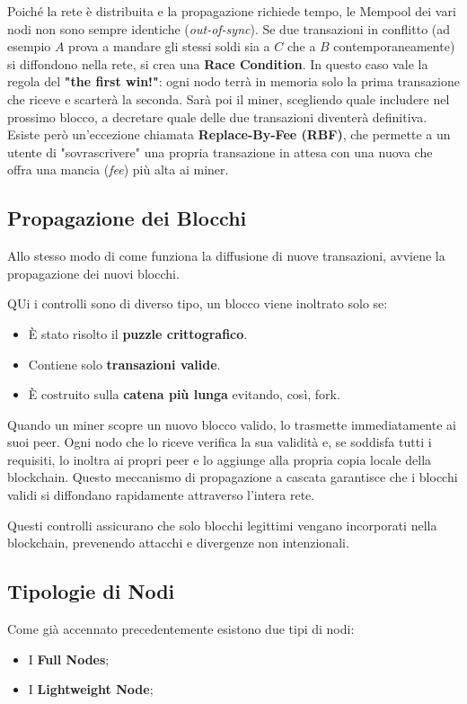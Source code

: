 Poiché la rete è distribuita e la propagazione richiede tempo, le Mempool dei vari nodi non sono sempre identiche (\textit{out-of-sync}). 
Se due transazioni in conflitto (ad esempio $A$ prova a mandare gli stessi soldi sia a $C$ che a $B$ contemporaneamente) si diffondono nella rete, si crea una \textbf{Race Condition}. 
In questo caso vale la regola del \textbf{"the first win!"}: ogni nodo terrà in memoria solo la prima transazione che riceve e scarterà la seconda. Sarà poi il miner, scegliendo quale includere nel prossimo blocco, a decretare quale delle due transazioni diventerà definitiva. Esiste però un'eccezione chiamata \textbf{Replace-By-Fee (RBF)}, che permette a un utente di "sovrascrivere" una propria transazione in attesa con una nuova che offra una mancia (\textit{fee}) più alta ai miner.

\subsection{Propagazione dei Blocchi}
Allo stesso modo di come funziona la diffusione di nuove transazioni, avviene la propagazione dei nuovi blocchi.

QUi i controlli sono di diverso tipo, un blocco viene inoltrato solo se:
\begin{itemize}
    \item È stato risolto il \textbf{puzzle crittografico}.
    \item Contiene solo \textbf{transazioni valide}.
    \item È costruito sulla \textbf{catena più lunga} evitando, così, fork.
\end{itemize}

Quando un miner scopre un nuovo blocco valido, lo trasmette immediatamente ai suoi peer. Ogni nodo che lo riceve verifica la sua validità e, se soddisfa tutti i requisiti, lo inoltra ai propri peer e lo aggiunge alla propria copia locale della blockchain. Questo meccanismo di propagazione a cascata garantisce che i blocchi validi si diffondano rapidamente attraverso l'intera rete.

Questi controlli assicurano che solo blocchi legittimi vengano incorporati nella blockchain, prevenendo attacchi e divergenze non intenzionali.

\subsection{Tipologie di Nodi}
Come già accennato precedentemente esistono due tipi di nodi:
\begin{itemize}
    \item I \textbf{Full Nodes};
    \item I \textbf{Lightweight Node};
\end{itemize}

